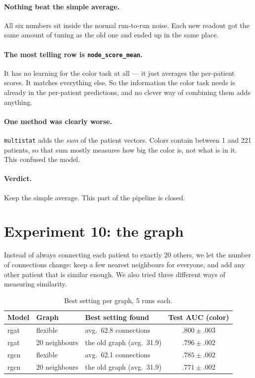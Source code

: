 \documentclass[11pt]{article}
\begin{document}
\paragraph{Nothing beat the simple average.} All six numbers sit inside the normal run-to-run noise.
Each new readout got the same amount of tuning as the old one and ended up in the same place.

\paragraph{The most telling row is \texttt{node\_score\_mean}.} It has no learning for the color task
at all --- it just averages the per-patient scores. It matches everything else. So the information
the color task needs is already in the per-patient predictions, and no clever way of combining them
adds anything.

\paragraph{One method was clearly worse.} \texttt{multistat} adds the \emph{sum} of the patient
vectors. Colors contain between 1 and 221 patients, so that sum mostly measures how big the color is,
not what is in it. This confused the model.

\paragraph{Verdict.} Keep the simple average. This part of the pipeline is closed.

\section*{Experiment 10: the graph}

Instead of always connecting each patient to exactly 20 others, we let the number of connections
change: keep a few nearest neighbours for everyone, and add any other patient that is similar enough.
We also tried three different ways of measuring similarity.

\begin{table}[h]
\centering
\begin{tabularx}{\textwidth}{llXc}
\toprule
Model & Graph & Best setting found & Test AUC (color) \\
\midrule
rgat & flexible & avg.\ 62.8 connections & $\mathbf{.800 \pm .003}$ \\
rgat & 20 neighbours & the old graph (avg.\ 31.9) & $.796 \pm .002$ \\
rgcn & flexible & avg.\ 62.1 connections & $.785 \pm .002$ \\
rgcn & 20 neighbours & the old graph (avg.\ 31.9) & $.771 \pm .002$ \\
\bottomrule
\end{tabularx}
\caption{Best setting per graph, 5 runs each.}
\end{table}
\end{document}
